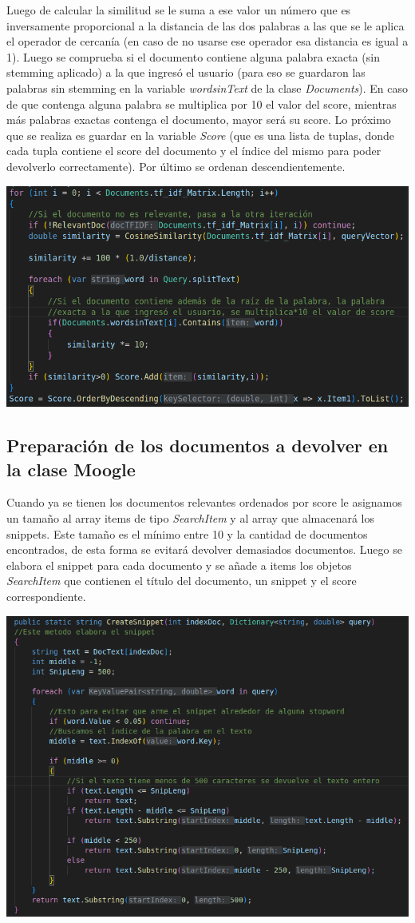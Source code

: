 \documentclass{article}
\begin{document}
Luego de calcular la similitud se le suma a ese valor un número que es inversamente proporcional a la distancia de las dos palabras a las que se le aplica el operador de cercanía (en caso de no usarse ese
operador esa distancia es igual a 1). Luego se comprueba si el documento contiene alguna palabra exacta (sin stemming aplicado) a la que ingresó el usuario (para eso se guardaron las palabras sin
stemming en la variable \textit{wordsinText} de la clase \textit{Documents}). En caso de que contenga alguna palabra
se multiplica por 10 el valor del score, mientras más palabras exactas contenga el documento, mayor será su score.
Lo próximo que se realiza es guardar en la variable \textit{Score} (que es una lista de tuplas, donde cada tupla contiene el score del documento y el índice del mismo para poder devolverlo correctamente). Por último se ordenan descendientemente.

\vspace{0.5cm}
\includegraphics[width=0.5\linewidth]{score.png}
\vspace{0.5cm}

\subsection{Preparación de los documentos a devolver en la clase Moogle}

Cuando ya se tienen los documentos relevantes ordenados por score le asignamos un tamaño al array items de tipo \textit{SearchItem} y al array que almacenará los snippets. Este tamaño es el mínimo entre 10 y la cantidad de documentos encontrados, de esta forma se evitará devolver demasiados documentos. Luego se elabora el snippet para cada documento y se añade a items los objetos \textit{SearchItem} que contienen el título del documento, un snippet y el score correspondiente.

\vspace{0.5cm}
\includegraphics[width=0.5\linewidth]{snippet.png}
\vspace{0.5cm}
\end{document}
